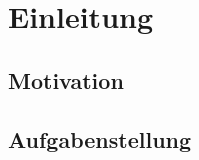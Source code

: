\chapter[Einleitung]{Einleitung}\label{sec:einleitung}

\section[Motivation]{Motivation}\label{sec:motivation}

\section[Aufgabenstellung]{Aufgabenstellung}\label{sec:aufgabenstellung}
